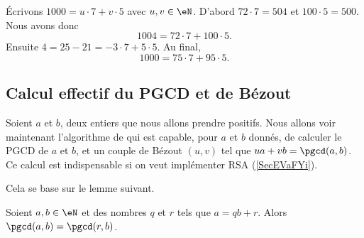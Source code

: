 \begin{example}
    Écrivons \( 1000=u\cdot 7+v\cdot 5\) avec \( u,v\in \eN\). D'abord \( 72\cdot 7=504\) et \( 100\cdot 5=500\). Nous avons donc
    \begin{equation}
        1004=72\cdot 7+100\cdot 5.
    \end{equation}
    Ensuite \( 4=25-21=-3\cdot 7+5\cdot 5\). Au final,
    \begin{equation}
        1000=75\cdot 7+95\cdot 5.
    \end{equation}
\end{example}

\subsection{Calcul effectif du PGCD et de Bézout}
\label{subSecIpmnhO}

Soient \( a\) et \( b\), deux entiers que nous allons prendre positifs. Nous allons voir maintenant l'algorithme de  qui est capable, pour \( a\) et \( b\) donnés, de calculer le PGCD de $a$ et $b$, et un couple de Bézout \( (u,v)\) tel que \( ua+vb=\pgcd(a,b)\). Ce calcul est indispensable si on veut implémenter RSA (\ref{SecEVaFYi}).

Cela se base sur le lemme suivant.

\begin{lemma}       \label{LemiVqita}
    Soient \( a,b\in \eN\) et des nombres \( q\) et \( r\) tels que \( a=qb+r\). Alors \( \pgcd(a,b)=\pgcd(r,b)\).
\end{lemma}

